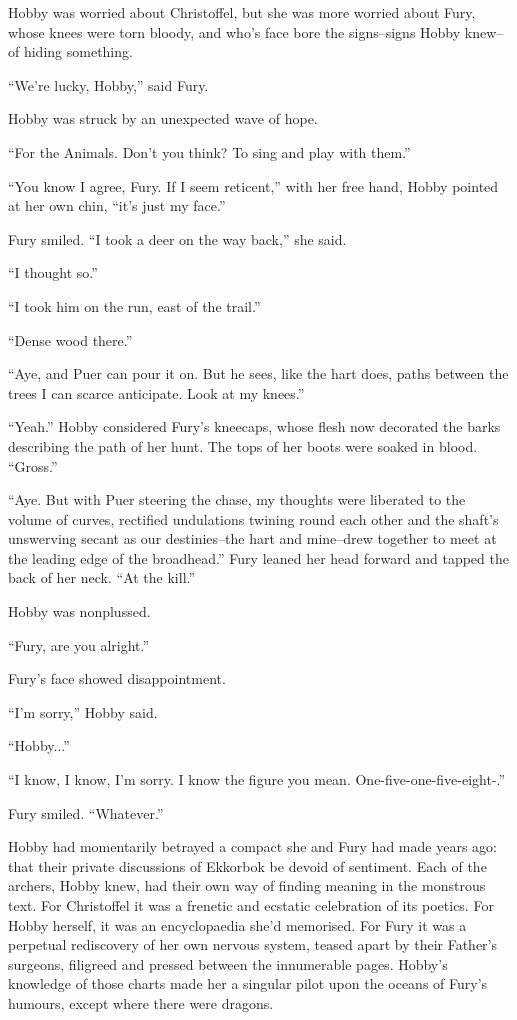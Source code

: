 \documentclass[11pt,a5paper]{article}
\begin{document}
Hobby was worried about Christoffel, but she was more worried about Fury, whose knees were torn bloody, and who's face bore the signs--signs Hobby knew--of hiding something.

``We're lucky, Hobby,'' said Fury.

Hobby was struck by an unexpected wave of hope.

``For the Animals. Don't you think? To sing and play with them.''

``You know I agree, Fury. If I seem reticent,'' with her free hand, Hobby pointed at her own chin, ``it's just my face.''

Fury smiled. ``I took a deer on the way back,'' she said.

``I thought so.''

``I took him on the run, east of the trail.''

``Dense wood there.''

``Aye, and Puer can pour it on. But he sees, like the hart does, paths between the trees I can scarce anticipate. Look at my knees.''

``Yeah.'' Hobby considered Fury's kneecaps, whose flesh now decorated the barks describing the path of her hunt. The tops of her boots were soaked in blood. ``Gross.''

``Aye. But with Puer steering the chase, my thoughts were liberated to the volume of curves, rectified undulations twining round each other and the shaft's unswerving secant as our destinies--the hart and mine--drew together to meet at the leading edge of the broadhead.'' Fury leaned her head forward and tapped the back of her neck. ``At the kill.''

Hobby was nonplussed.

``Fury, are you alright.''

Fury's face showed disappointment.

``I'm sorry,'' Hobby said.

``Hobby...''

``I know, I know, I'm sorry. I know the figure you mean. One-five-one-five-eight-.''

Fury smiled. ``Whatever.''

Hobby had momentarily betrayed a compact she and Fury had made years ago: that their private discussions of Ekkorbok be devoid of sentiment. Each of the archers, Hobby knew, had their own way of finding meaning in the monstrous text. For Christoffel it was a frenetic and ecstatic celebration of its poetics. For Hobby herself, it was an encyclopaedia she'd memorised. For Fury it was a perpetual rediscovery of her own nervous system, teased apart by their Father's surgeons, filigreed and pressed between the innumerable pages. Hobby's knowledge of those charts made her a singular pilot upon the oceans of Fury's humours, except where there were dragons.
\end{document}
